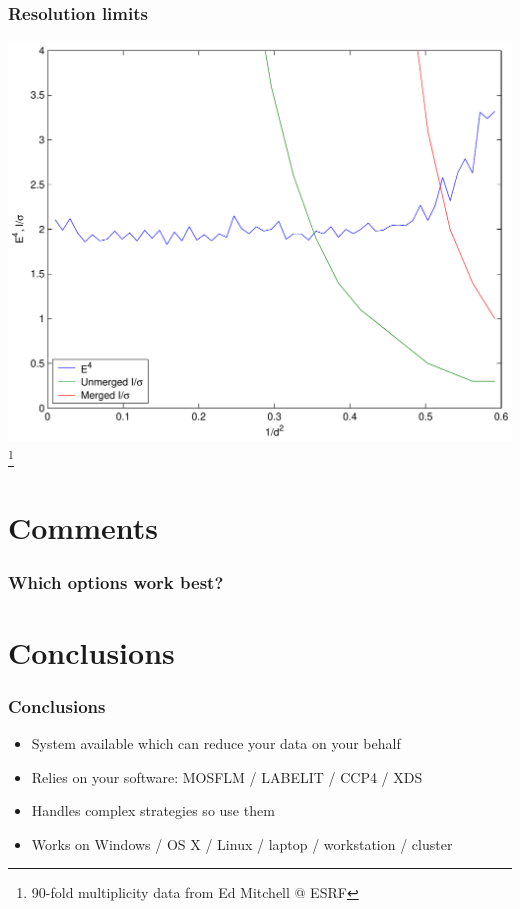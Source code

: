 \documentclass[slides,compress]{beamer}
\begin{document}
\begin{frame}
\frametitle{Resolution limits}
\hspace{6cm}
\includegraphics[scale=0.5]{figures/plat-13A-z4.pdf}
\footnote{90-fold multiplicity data from Ed Mitchell @ ESRF}
\end{frame}

\section{Comments}

\begin{frame}
\frametitle{Which options work best?}
\begin{itemize}
\end{itemize}
\end{frame}

\section{Conclusions}

\begin{frame}
\frametitle{Conclusions}
\begin{itemize}
\item{System available which can reduce your data on your behalf}
\item{Relies on your software: MOSFLM / LABELIT / CCP4 / XDS}
\item{Handles complex strategies so use them}
\item{Works on Windows / OS X / Linux / laptop / workstation / cluster}
\end{itemize}
\end{frame}
\end{document}
